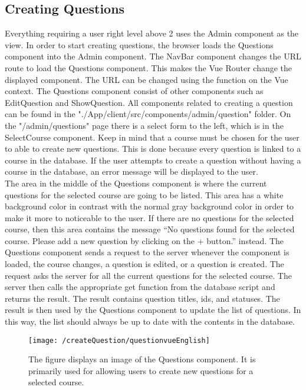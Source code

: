 \subsection{Creating Questions}
Everything requiring a user right level above 2 uses the Admin component as the view.  In order to start creating questions, the browser loads the Questions component into the Admin component. 
The NavBar component changes the URL route to load the Questions component. This makes the Vue Router change the displayed component. The URL can be changed using the  function on the Vue context. The Questions component consist of other components such as EditQuestion and ShowQuestion. All components related to creating a question can be found in the "./App/client/src/components/admin/question" folder. On the "/admin/questions" page there is a select form to the left, which is in the SelectCourse component. Keep in mind that a course must be chosen for the user to able to create new questions. This is done because every question is linked to a course in the database.  If the user attempts to create a question without having a course in the database, an error message will be displayed to the user.
\\[11pt]
The area in the middle of the Questions component is where the current questions for the selected course are going to be listed. This area has a white background color in contrast with the normal gray background color in order to make it more to noticeable to the user. If there are no questions for the selected course, then this area contains the message “No questions found for the selected course. Please add a new question by clicking on the + button.” instead. The Questions component sends a request to the server whenever the component is loaded, the course changes, a question is edited, or a question is created. The request asks the server for all the current questions for the selected course. The server then calls the appropriate get function from the database script and returns the result. The result contains question titles, ids, and statuses. The result is then used by the Questions component to update the list of questions. In this way, the list should always be up to date with the contents in the database. 
\begin{figure}[H]
    \centering
    \texttt{[image: /createQuestion/questionvueEnglish]}
    \caption{The figure displays an image of the Questions component. It is primarily used for allowing users to create new questions for a selected course. }
    \label{fig:questionVue}
\end{figure}
